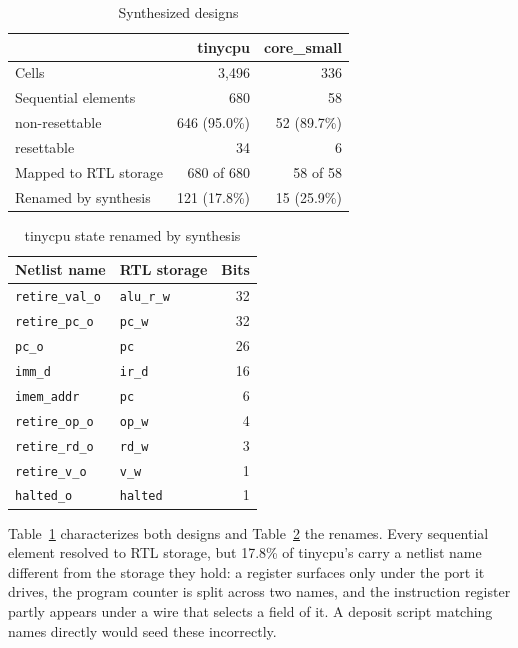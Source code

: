 \documentclass[journal]{IEEEtran}
\begin{document}
\begin{table}[!t]
\caption{Synthesized designs}
\label{tab:synth}
\centering\footnotesize
\begin{tabular}{lrr}
\toprule
 & tinycpu & core\_small \\
\midrule
Cells                    & 3{,}496 & 336 \\
Sequential elements      & 680 & 58 \\
\quad non-resettable     & 646 (95.0\%) & 52 (89.7\%) \\
\quad resettable         & 34 & 6 \\
Mapped to RTL storage    & 680 of 680 & 58 of 58 \\
Renamed by synthesis     & 121 (17.8\%) & 15 (25.9\%) \\
\bottomrule
\end{tabular}
\end{table}

\begin{table}[!t]
\caption{tinycpu state renamed by synthesis}
\label{tab:rename}
\centering\footnotesize
\begin{tabular}{llr}
\toprule
Netlist name & RTL storage & Bits \\
\midrule
\texttt{retire\_val\_o} & \texttt{alu\_r\_w} & 32 \\
\texttt{retire\_pc\_o}  & \texttt{pc\_w}     & 32 \\
\texttt{pc\_o}          & \texttt{pc}        & 26 \\
\texttt{imm\_d}         & \texttt{ir\_d}     & 16 \\
\texttt{imem\_addr}     & \texttt{pc}        & 6 \\
\texttt{retire\_op\_o}  & \texttt{op\_w}     & 4 \\
\texttt{retire\_rd\_o}  & \texttt{rd\_w}     & 3 \\
\texttt{retire\_v\_o}   & \texttt{v\_w}      & 1 \\
\texttt{halted\_o}      & \texttt{halted}    & 1 \\
\bottomrule
\end{tabular}
\end{table}

Table~\ref{tab:synth} characterizes both designs and Table~\ref{tab:rename} the
renames. Every sequential element resolved to RTL storage, but 17.8\% of tinycpu's
carry a netlist name different from the storage they hold: a register surfaces
only under the port it drives, the program counter is split across two names, and
the instruction register partly appears under a wire that selects a field of it.
A deposit script matching names directly would seed these incorrectly.
\end{document}
